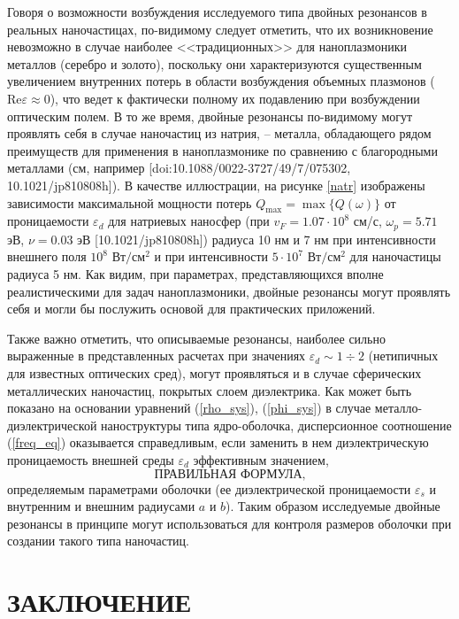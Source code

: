 \documentclass[12pt, a4paper]{article}
\def \eps {\varepsilon}
\def \w {\omega}
\begin{document}
Говоря о возможности возбуждения исследуемого типа двойных резонансов в реальных наночастицах, по-видимому следует отметить, что их возникновение невозможно в случае наиболее <<традиционных>> для наноплазмоники металлов (серебро и золото), поскольку они характеризуются существенным увеличением внутренних потерь в области возбуждения объемных плазмонов ($\textrm{Re}\eps \approx 0$), что ведет к фактически полному их подавлению при возбуждении оптическим полем.
В то же время, двойные резонансы по-видимому могут проявлять себя в случае наночастиц из натрия, -- металла, обладающего рядом преимуществ для применения в наноплазмонике по сравнению с благородными металлами (см, например [doi:10.1088/0022-3727/49/7/075302, 10.1021/jp810808h]).
В качестве иллюстрации, на рисунке \ref{natr} изображены зависимости максимальной мощности потерь $Q_\textrm{max} = \max\{Q(\w)\}$ от проницаемости $\eps_d$ для натриевых наносфер (при $v_F = 1.07\cdot10^8$ см/с, $\w_p = 5.71$ эВ, $\nu = 0.03$ эВ [10.1021/jp810808h]) радиуса 10 нм и 7 нм при интенсивности внешнего поля $10^8$ $\text{Вт}/\text{см}^2$ и при интенсивности $5 \cdot 10^7$ $\text{Вт}/\text{см}^2$ для наночастицы радиуса 5 нм.
Как видим, при параметрах, представляющихся вполне реалистическими для задач наноплазмоники, двойные резонансы могут проявлять себя и могли бы послужить основой для практических приложений. 

Также важно отметить, что описываемые резонансы, наиболее сильно выраженные в представленных расчетах при значениях $\eps_d \sim 1\div2$ (нетипичных для известных оптических сред), могут проявляться и в случае сферических металлических наночастиц, покрытых слоем диэлектрика.
Как может быть показано на основании уравнений (\ref{rho_sys}), (\ref{phi_sys}) в случае металло-диэлектрической наноструктуры типа ядро-оболочка, дисперсионное соотношение (\ref{freq_eq}) оказывается справедливым, если заменить в нем диэлектрическую проницаемость внешней среды $\eps_d$ эффективным значением, 
\begin{equation} 	
\textrm{ПРАВИЛЬНАЯ ФОРМУЛА,}
\end{equation}
определяемым параметрами оболочки (ее диэлектрической проницаемости $\eps_s$ и внутренним и внешним радиусами $a$ и $b$). Таким образом исследуемые двойные резонансы в принципе могут использоваться для контроля размеров оболочки при создании такого типа наночастиц.


\section{ЗАКЛЮЧЕНИЕ}
\end{document}
